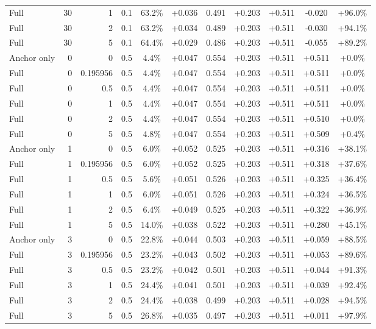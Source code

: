 \begin{table}[htbp]
\begin{tabular}{lrrrccccccc}
Full & 30 & 1 & 0.1 & 63.2\% & +0.036 & 0.491 & +0.203 & +0.511 & -0.020 & +96.0\% \\
Full & 30 & 2 & 0.1 & 63.2\% & +0.034 & 0.489 & +0.203 & +0.511 & -0.030 & +94.1\% \\
Full & 30 & 5 & 0.1 & 64.4\% & +0.029 & 0.486 & +0.203 & +0.511 & -0.055 & +89.2\% \\
Anchor only & 0 & 0 & 0.5 & 4.4\% & +0.047 & 0.554 & +0.203 & +0.511 & +0.511 & +0.0\% \\
Full & 0 & 0.195956 & 0.5 & 4.4\% & +0.047 & 0.554 & +0.203 & +0.511 & +0.511 & +0.0\% \\
Full & 0 & 0.5 & 0.5 & 4.4\% & +0.047 & 0.554 & +0.203 & +0.511 & +0.511 & +0.0\% \\
Full & 0 & 1 & 0.5 & 4.4\% & +0.047 & 0.554 & +0.203 & +0.511 & +0.511 & +0.0\% \\
Full & 0 & 2 & 0.5 & 4.4\% & +0.047 & 0.554 & +0.203 & +0.511 & +0.510 & +0.0\% \\
Full & 0 & 5 & 0.5 & 4.8\% & +0.047 & 0.554 & +0.203 & +0.511 & +0.509 & +0.4\% \\
Anchor only & 1 & 0 & 0.5 & 6.0\% & +0.052 & 0.525 & +0.203 & +0.511 & +0.316 & +38.1\% \\
Full & 1 & 0.195956 & 0.5 & 6.0\% & +0.052 & 0.525 & +0.203 & +0.511 & +0.318 & +37.6\% \\
Full & 1 & 0.5 & 0.5 & 5.6\% & +0.051 & 0.526 & +0.203 & +0.511 & +0.325 & +36.4\% \\
Full & 1 & 1 & 0.5 & 6.0\% & +0.051 & 0.526 & +0.203 & +0.511 & +0.324 & +36.5\% \\
Full & 1 & 2 & 0.5 & 6.4\% & +0.049 & 0.525 & +0.203 & +0.511 & +0.322 & +36.9\% \\
Full & 1 & 5 & 0.5 & 14.0\% & +0.038 & 0.522 & +0.203 & +0.511 & +0.280 & +45.1\% \\
Anchor only & 3 & 0 & 0.5 & 22.8\% & +0.044 & 0.503 & +0.203 & +0.511 & +0.059 & +88.5\% \\
Full & 3 & 0.195956 & 0.5 & 23.2\% & +0.043 & 0.502 & +0.203 & +0.511 & +0.053 & +89.6\% \\
Full & 3 & 0.5 & 0.5 & 23.2\% & +0.042 & 0.501 & +0.203 & +0.511 & +0.044 & +91.3\% \\
Full & 3 & 1 & 0.5 & 24.4\% & +0.041 & 0.501 & +0.203 & +0.511 & +0.039 & +92.4\% \\
Full & 3 & 2 & 0.5 & 24.4\% & +0.038 & 0.499 & +0.203 & +0.511 & +0.028 & +94.5\% \\
Full & 3 & 5 & 0.5 & 26.8\% & +0.035 & 0.497 & +0.203 & +0.511 & +0.011 & +97.9\% \\

\end{tabular}
\end{table}

